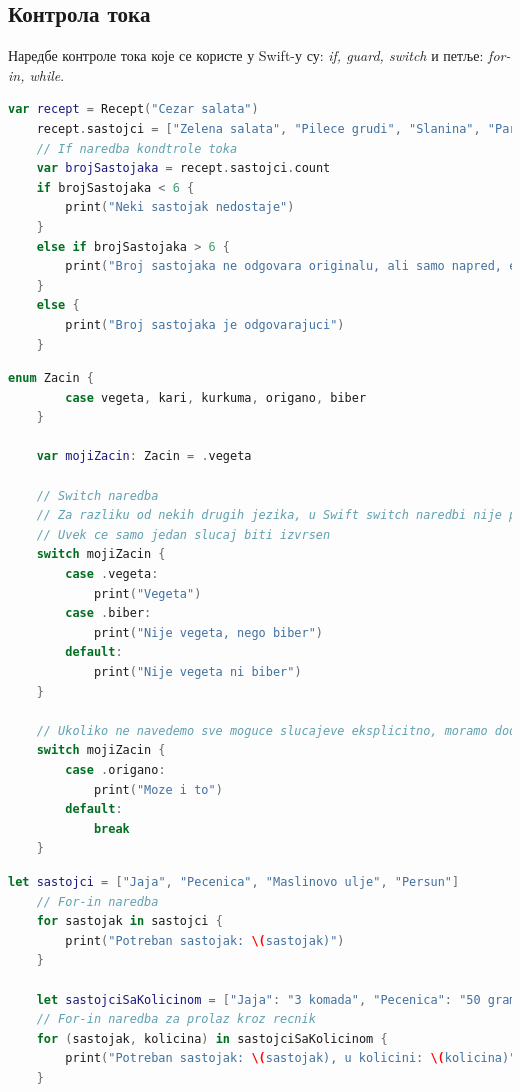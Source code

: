 \documentclass[12pt,oneside]{memoir}
\begin{document}
\subsection{Контрола тока}

\indent Наредбе контроле тока које се користе у Swift-у су: \textit{if, guard, switch} и петље: \textit{for-in, while}.

\begin{lstlisting}[caption=\textit{{If наредбa контроле тока}}, label={lst:If наредба контроле тока}, language=Swift, frame=single]
    var recept = Recept("Cezar salata")
    recept.sastojci = ["Zelena salata", "Pilece grudi", "Slanina", "Paradajz", "Hleb", "Cezar premaz"]
    // If naredba kondtrole toka
    var brojSastojaka = recept.sastojci.count
    if brojSastojaka < 6 {
        print("Neki sastojak nedostaje")
    }
    else if brojSastojaka > 6 {
        print("Broj sastojaka ne odgovara originalu, ali samo napred, eksperimentisi")
    }
    else {
        print("Broj sastojaka je odgovarajuci")
    }
\end{lstlisting}

\begin{lstlisting}[caption=\textit{{Switch наредба контроле тока}}, label={lst:Switch наредба контроле тока}, language=Swift, frame=single]
    enum Zacin {
        case vegeta, kari, kurkuma, origano, biber
    }
    
    var mojiZacin: Zacin = .vegeta
    
    // Switch naredba
    // Za razliku od nekih drugih jezika, u Swift switch naredbi nije potrebno eksplicitno navodjenje 'break' naredbe nakon svakog slucaja
    // Uvek ce samo jedan slucaj biti izvrsen
    switch mojiZacin {
        case .vegeta:
            print("Vegeta")
        case .biber:
            print("Nije vegeta, nego biber")
        default:
            print("Nije vegeta ni biber")
    }
    
    // Ukoliko ne navedemo sve moguce slucajeve eksplicitno, moramo dodati slucaj 'default', koji ukoliko zelimo da bude prazan mozemo ostaviti naredbu 'break'
    switch mojiZacin {
        case .origano:
            print("Moze i to")
        default:
            break
    }
\end{lstlisting}

\begin{lstlisting}[caption=\textit{{For-in наредбa контроле тока}}, label={lst:For-in наредба контроле тока}, language=Swift, frame=single]
    let sastojci = ["Jaja", "Pecenica", "Maslinovo ulje", "Persun"]
    // For-in naredba
    for sastojak in sastojci {
        print("Potreban sastojak: \(sastojak)")
    }
    
    let sastojciSaKolicinom = ["Jaja": "3 komada", "Pecenica": "50 grama", "Maslinovo ulje": "Koliko je potrebno da pokrije tiganj", "Persun": "Prstohvat"]
    // For-in naredba za prolaz kroz recnik
    for (sastojak, kolicina) in sastojciSaKolicinom {
        print("Potreban sastojak: \(sastojak), u kolicini: \(kolicina)")
    }
\end{lstlisting}
\end{document}
